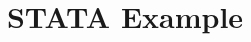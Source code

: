 \documentclass[dvipsnames,hyperref={pdfpagelabels=false}]{beamer}
\begin{document}


	
	




\title[]  
{STATA Example}


\author 
{}

\institute{}
\end{document}
